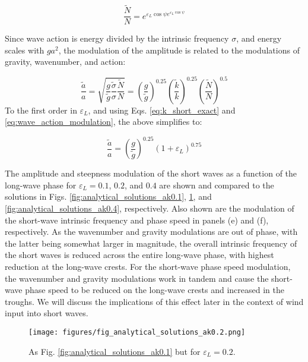 \documentclass[lineno]{jfm}
\begin{document}
\begin{equation}
\label{eq:wave_action_modulation}
\frac{\widetilde{N}}{N} = e^{\varepsilon_L \cos{\psi} e^{\varepsilon_L \cos{\psi}}}
\end{equation}

Since wave action is energy divided by the intrinsic frequency $\sigma$,
and energy scales with $ga^2$, the modulation of the amplitude is related to the
modulations of gravity, wavenumber, and action:

\begin{equation}
\label{eq:wave_amplitude_modulation}
\dfrac{\widetilde{a}}{a} = \sqrt{
  \dfrac{g}{\widetilde{g}}
  \dfrac{\widetilde{\sigma}}{\sigma}
  \dfrac{\widetilde{N}}{N}}
=
  \left( \dfrac{g}{\widetilde{g}} \right)^{0.25}
  \left( \dfrac{\widetilde{k}}{k} \right)^{0.25}
  \left( \dfrac{\widetilde{N}}{N} \right)^{0.5}
\end{equation}
To the first order in $\varepsilon_L$, and using Eqs. \ref{eq:k_short_exact}
and \ref{eq:wave_action_modulation}, the above simplifies to:

\begin{equation}
\label{eq:wave_amplitude_modulation_order1}
\dfrac{\widetilde{a}}{a} = 
  \left( \dfrac{g}{\widetilde{g}} \right)^{0.25}
  \left( 1 + \varepsilon_L \right)^{0.75}
\end{equation}

The amplitude and steepness modulation of the short waves as a function of the
long-wave phase for $\varepsilon_L = 0.1$, $0.2$, and $0.4$ are shown and compared
to the \citet{longuet1960changes} solutions in Figs.
\ref{fig:analytical_solutions_ak0.1}, \ref{fig:analytical_solutions_ak0.2},
and \ref{fig:analytical_solutions_ak0.4}, respectively.
Also shown are the modulation of the short-wave intrinsic frequency and phase
speed in panels (e) and (f), respectively.
As the wavenumber and gravity modulations are out of phase, with the latter
being somewhat larger in magnitude, the overall intrinsic frequency of the
short waves is reduced across the entire long-wave phase, with highest reduction
at the long-wave crests.
For the short-wave phase speed modulation, the wavenumber and gravity modulations
work in tandem and cause the short-wave phase speed to be reduced on the long-wave
crests and increased in the troughs.
We will discuss the implications of this effect later in the context of wind
input into short waves.

\begin{figure}
\centering
\texttt{[image: figures/fig\_analytical\_solutions\_ak0.2.png]}
\caption{As Fig. \ref{fig:analytical_solutions_ak0.1} but for $\varepsilon_L = 0.2$.}
\label{fig:analytical_solutions_ak0.2}
\end{figure}
\end{document}
